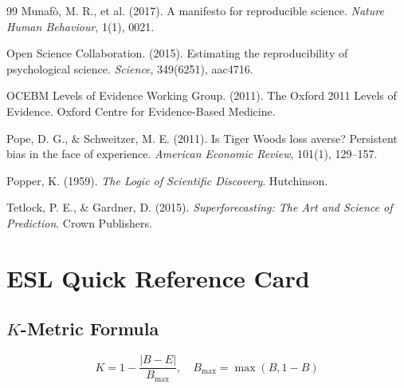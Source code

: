 \documentclass[11pt,a4paper]{article}
\begin{document}
\begin{thebibliography}{99}
Munaf\`{o}, M. R., et al. (2017).
A manifesto for reproducible science.
\textit{Nature Human Behaviour}, 1(1), 0021.

Open Science Collaboration. (2015).
Estimating the reproducibility of psychological science.
\textit{Science}, 349(6251), aac4716.

OCEBM Levels of Evidence Working Group. (2011).
The Oxford 2011 Levels of Evidence.
Oxford Centre for Evidence-Based Medicine.

Pope, D. G., \& Schweitzer, M. E. (2011).
Is Tiger Woods loss averse? Persistent bias in the face of experience.
\textit{American Economic Review}, 101(1), 129--157.

Popper, K. (1959).
\textit{The Logic of Scientific Discovery}.
Hutchinson.

Tetlock, P. E., \& Gardner, D. (2015).
\textit{Superforecasting: The Art and Science of Prediction}.
Crown Publishers.

\end{thebibliography}


\appendix

\section{ESL Quick Reference Card}
\label{app:quickref}

\subsection{$K$-Metric Formula}
\begin{equation}
K = 1 - \frac{|B - E|}{B_{\max}}, \quad B_{\max} = \max(B, 1-B)
\end{equation}
\end{document}
